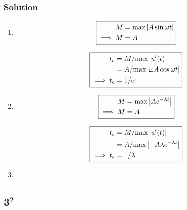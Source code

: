 \documentclass[12pt]{article}
\begin{document}
\subsubsection*{Solution}
\begin{enumerate}
\item
  \begin{equation} \boxed{
    \begin{aligned}
      M &= \text{max}\left|{A\sin\omega t}\right| \\
      \implies M &= A \\
    \end{aligned}
    }
  \end{equation}

  \begin{equation} \boxed{
    \begin{aligned}
      t_c &= M/\text{max}\left|{u'(t)}\right| \\
      &= A/\text{max}\left|{\omega A \cos \omega t}\right| \\
      \implies t_c &= 1/\omega \\
    \end{aligned}
    }
  \end{equation}
\item
  \begin{equation} \boxed{
    \begin{aligned}
      M &= \text{max}\left|{Ae^{-\lambda t}}\right| \\
      \implies M &= A \\
    \end{aligned}
    }
  \end{equation}

  \begin{equation} \boxed{
    \begin{aligned}
      t_c &= M/\text{max}\left|{u'(t)}\right| \\
      &= A/\text{max}\left|{-A\lambda e^{-\lambda t}}\right| \\
      \implies t_c &= 1/\lambda \\
    \end{aligned}
    }
  \end{equation}

\item
\todo
\end{enumerate}

\subsection{3$^2$}
\end{document}
